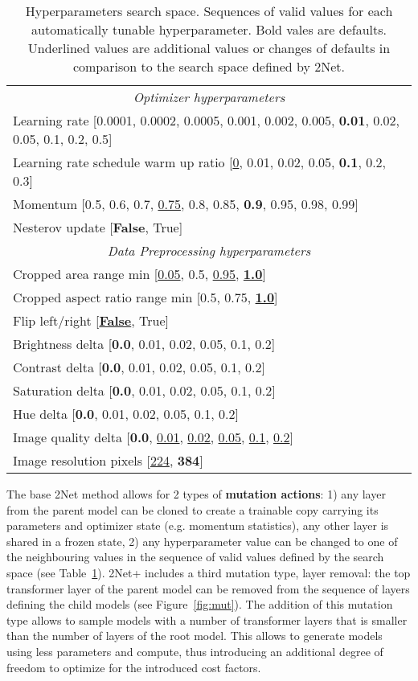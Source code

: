 \documentclass{article} \usepackage{iclr2023_conference,times}
\newcommand{\method}{2Net+\xspace}
\begin{document}
\begin{table}[t]
  \caption{
Hyperparameters search space.
Sequences of valid values for each automatically tunable hyperparameter.
Bold vales are defaults.
Underlined values are additional values or changes of defaults in comparison to the search space defined by 2Net.
}
  \label{table:hps}
  \centering
  \begin{tabular}{l}
  \toprule
\multicolumn{1}{c}{\emph{Optimizer hyperparameters}} \\
Learning rate  [0.0001, 0.0002, 0.0005, 0.001, 0.002, 0.005, \textbf{0.01}, 0.02, 0.05, 0.1, 0.2, 0.5] \\
Learning rate schedule warm up ratio  [\underline{0}, 0.01, 0.02, 0.05, \textbf{0.1}, 0.2, 0.3] \\
Momentum  [0.5, 0.6, 0.7, \underline{0.75}, 0.8, 0.85, \textbf{0.9}, 0.95, 0.98, 0.99] \\
Nesterov update  [\textbf{False}, True] \\
\midrule
\multicolumn{1}{c}{\emph{Data Preprocessing hyperparameters}} \\
Cropped area range min  [\underline{0.05}, 0.5, \underline{0.95}, \underline{\textbf{1.0}}] \\
Cropped aspect ratio range min  [0.5, 0.75, \underline{\textbf{1.0}}] \\
Flip left/right  [\underline{\textbf{False}}, True] \\
Brightness delta  [\textbf{0.0}, 0.01, 0.02, 0.05, 0.1, 0.2] \\
Contrast delta  [\textbf{0.0}, 0.01, 0.02, 0.05, 0.1, 0.2] \\
Saturation delta  [\textbf{0.0}, 0.01, 0.02, 0.05, 0.1, 0.2] \\
Hue delta  [\textbf{0.0}, 0.01, 0.02, 0.05, 0.1, 0.2] \\
Image quality delta  [\textbf{0.0}, \underline{0.01}, \underline{0.02}, \underline{0.05}, \underline{0.1}, \underline{0.2}] \\
Image resolution pixels  [\underline{224}, \textbf{384}] \\
\bottomrule
  \end{tabular}
\vspace{-12pt}
\end{table}


The base 2Net method allows for 2 types of \textbf{mutation actions}: 1) any layer from the parent model can be cloned to create a trainable copy carrying its parameters and optimizer state (e.g. momentum statistics), any other layer is shared in a frozen state,
2) any hyperparameter value can be changed to one of the neighbouring values in the sequence of valid values defined by the search space (see Table~\ref{table:hps}).
\method includes a third mutation type, layer removal: the top transformer layer of the parent model can be removed from the sequence of layers defining the child models (see Figure~\ref{fig:mut}).
The addition of this mutation type allows to sample models with a number of transformer layers that is smaller than the number of layers of the root model.
This allows to generate models using less parameters and compute, thus introducing an additional degree of freedom to optimize for the introduced cost factors.
\end{document}
